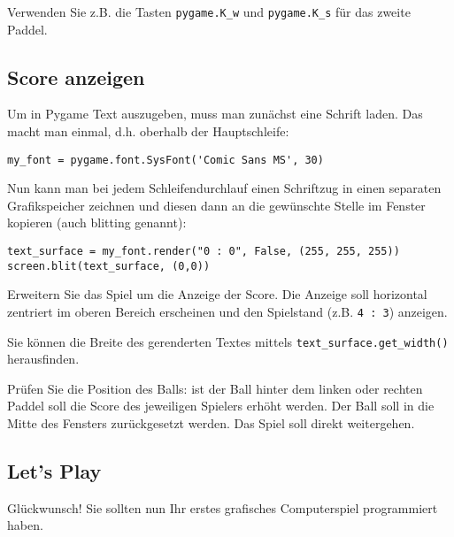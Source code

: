 \documentclass[
]{scrartcl}
\begin{document}
 Verwenden Sie z.B. die Tasten \texttt{pygame.K\_w} und
\texttt{pygame.K\_s} für das zweite Paddel.

\hypertarget{score-anzeigen}{%
\subsection{Score anzeigen}\label{score-anzeigen}}

Um in Pygame Text auszugeben, muss man zunächst eine Schrift laden. Das
macht man einmal, d.h. oberhalb der Hauptschleife:

\begin{verbatim}
my_font = pygame.font.SysFont('Comic Sans MS', 30)
\end{verbatim}

Nun kann man bei jedem Schleifendurchlauf einen Schriftzug in einen
separaten Grafikspeicher zeichnen und diesen dann an die gewünschte
Stelle im Fenster kopieren (auch blitting genannt):

\begin{verbatim}
text_surface = my_font.render("0 : 0", False, (255, 255, 255))
screen.blit(text_surface, (0,0))
\end{verbatim}

 Erweitern Sie das Spiel um die Anzeige der Score. Die
Anzeige soll horizontal zentriert im oberen Bereich erscheinen und den
Spielstand (z.B. \texttt{4\ :\ 3}) anzeigen.

 Sie können die Breite des gerenderten Textes mittels
\texttt{text\_surface.get\_width()} herausfinden.

 Prüfen Sie die Position des Balls: ist der Ball hinter dem
linken oder rechten Paddel soll die Score des jeweiligen Spielers erhöht
werden. Der Ball soll in die Mitte des Fensters zurückgesetzt werden.
Das Spiel soll direkt weitergehen.

\hypertarget{lets-play}{%
\subsection{Let’s Play}\label{lets-play}}

Glückwunsch! Sie sollten nun Ihr erstes grafisches Computerspiel
programmiert haben.
\end{document}
